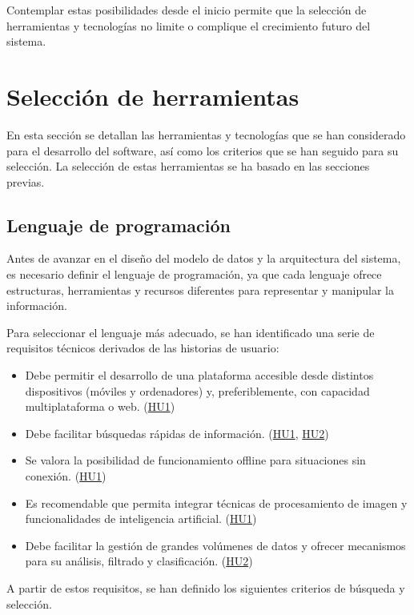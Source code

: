 Contemplar estas posibilidades desde el inicio permite que la selección de herramientas y tecnologías
no limite o complique el crecimiento futuro del sistema.

\section{Selección de herramientas}
En esta sección se detallan las herramientas y tecnologías que se han considerado para el desarrollo
del software, así como los criterios que se han seguido para su selección. La selección de estas
herramientas se ha basado en las secciones previas.

\subsection{Lenguaje de programación}\label{sec:lenguaje-programación}
Antes de avanzar en el diseño del modelo de datos y la arquitectura del sistema, es necesario definir 
el lenguaje de programación, ya que cada lenguaje ofrece estructuras, herramientas y recursos diferentes 
para representar y manipular la información.

Para seleccionar el lenguaje más adecuado, se han identificado una serie de requisitos técnicos derivados
de las historias de usuario:

\begin{itemize}
    \item Debe permitir el desarrollo de una plataforma accesible desde distintos dispositivos 
    (móviles y ordenadores) y, preferiblemente, con capacidad multiplataforma o web. (\hyperref[sec:hu1]{HU1})
    \item Debe facilitar búsquedas rápidas de información. (\hyperref[sec:hu1]{HU1}, \hyperref[sec:hu2]{HU2})
    \item Se valora la posibilidad de funcionamiento offline para situaciones sin conexión. (\hyperref[sec:hu1]{HU1})
    \item Es recomendable que permita integrar técnicas de procesamiento de imagen y funcionalidades de inteligencia artificial. (\hyperref[sec:hu1]{HU1})
    \item Debe facilitar la gestión de grandes volúmenes de datos y ofrecer mecanismos para su análisis, filtrado y clasificación. (\hyperref[sec:hu2]{HU2})
\end{itemize}

A partir de estos requisitos, se han definido los siguientes criterios de búsqueda y selección.


